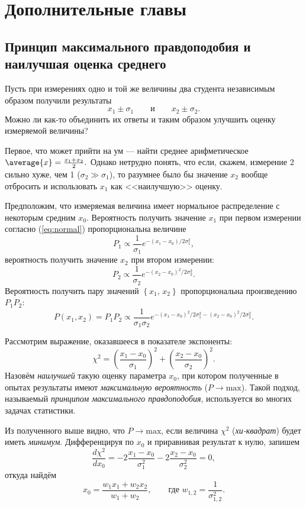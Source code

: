 \chapter{Дополнительные главы}

\small

\section{Принцип максимального правдоподобия и наилучшая оценка среднего}

Пусть при измерениях одно и той же величины два студента
независимым образом получили результаты 
\[
x_{1}\pm\sigma_{1}\qquad\text{и}\qquad x_{2}\pm\sigma_{2}.
\]
Можно ли как-то объединить их ответы и таким образом улучшить оценку
измеряемой величины?

Первое, что может прийти на ум --- найти среднее
арифметическое $\average{x}=\frac{x_{1}+x_{2}}{2}.$ Однако нетрудно
понять, что если, скажем, измерение 2 сильно хуже, чем 1 ($\sigma_{2}\gg\sigma_{1}$),
то разумнее было бы значение $x_{2}$ вообще отбросить и использовать
$x_{1}$ как <<наилучшую>> оценку.

Предположим, что измеряемая величина имеет нормальное распределение
с некоторым средним $x_{0}$. Вероятность получить значение $x_{1}$
при первом измерении согласно (\ref{eq:normal}) пропорциональна величине
\[
P_{1}\propto\frac{1}{\sigma_{1}}e^{-\left(x_{1}-x_{0}\right)/2\sigma_{1}^{2}},
\]
вероятность получить значение $x_{2}$ при втором измерении:
\[
P_{2}\propto\frac{1}{\sigma_{2}}e^{-\left(x_{2}-x_{0}\right)^{2}/2\sigma_{2}^{2}}.
\]
Вероятность получить пару значений $\left\{ x_{1},\,x_{2}\right\} $
пропорциональна произведению $P_{1}P_{2}$:
\[
P\left(x_{1},x_{2}\right)=P_{1}P_{2}\propto\frac{1}{\sigma_{1}\sigma_{2}}e^{-\left(x_{1}-x_{0}\right)^{2}/2\sigma_{1}^{2}-\left(x_{2}-x_{0}\right)^{2}/2\sigma_{2}^{2}}.
\]

Рассмотрим выражение, оказавшееся в показателе экспоненты:
\[
\chi^{2}=\left(\frac{x_{1}-x_{0}}{\sigma_{1}}\right)^{2}+\left(\frac{x_{2}-x_{0}}{\sigma_{2}}\right)^{2}.
\]
Назовём \emph{наилучшей} такую оценку параметра
$x_{0}$, при котором полученные в опытах результаты имеют \emph{максимальную
вероятность} ($P\to\mathrm{max}$). Такой подход, называемый
\emph{принципом максимального правдоподобия}, используется
во многих задачах статистики.

Из полученного выше видно, что $P\to\mathrm{max}$, если
величина $\chi^{2}$ (\emph{хи-квадрат}) будет иметь
\emph{минимум}. Дифференцируя по $x_{0}$ и приравнивая
результат к нулю, запишем 
\[
\frac{d\chi^{2}}{dx_{0}}=-2\frac{x_{1}-x_{0}}{\sigma_{1}^{2}}-2\frac{x_{2}-x_{0}}{\sigma_{2}^{2}}=0,
\]
откуда найдём
\begin{equation}
x_{0}=\frac{w_{1}x_{1}+w_{2}x_{2}}{w_{1}+w_{2}},\qquad\text{где }w_{1,2}=\frac{1}{\sigma_{1,2}^{2}}.
\end{equation}

